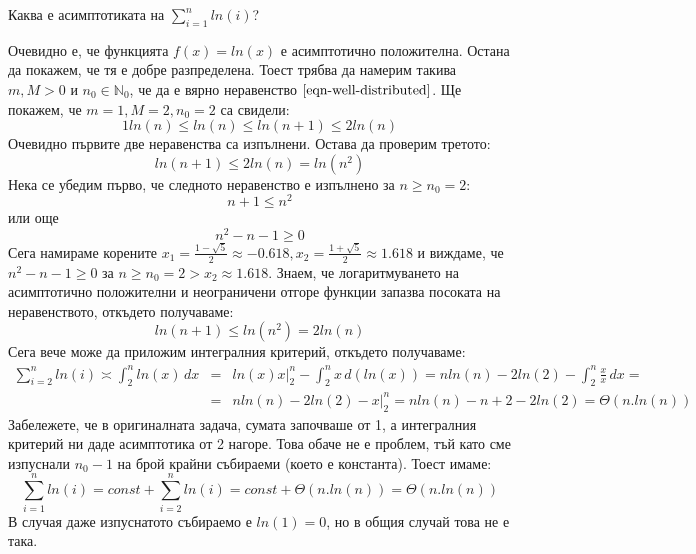 \begin{application}
	Каква е асимптотиката на $\sum\limits_{i=1}^nln(i)$?
\end{application}
\begin{solution}
	Очевидно е, че функцията $f(x)=ln(x)$ е асимптотично положителна. Остана да покажем, че тя е добре разпределена. Тоест трябва да намерим такива $m,M>0$ и $n_0\in\mathbb{N}_0$, че да е вярно неравенство $\ref{eqn-well-distributed}$. Ще покажем, че $m=1,M=2,n_0=2$ са свидели:
	\begin{equation*}
		1ln(n)\le ln(n)\le ln(n+1)\le 2ln(n)
	\end{equation*}
	Очевидно първите две неравенства са изпълнени. Остава да проверим третото:
	\begin{equation*}
		ln(n+1)\le 2ln(n)=ln(n^2)
	\end{equation*}
	Нека се убедим първо, че следното неравенство е изпълнено за $n\ge n_0=2$:
	\begin{equation*}
		n+1\le n^2
	\end{equation*}
	или още
	\begin{equation*}
		n^2-n-1\ge0
	\end{equation*}
	Сега намираме корените $x_1=\frac{1-\sqrt5}{2}\approx-0.618,x_2=\frac{1+\sqrt5}{2}\approx1.618$ и виждаме, че $n^2-n-1\ge0$ за $n\ge n_0=2>x_2\approx1.618$.
	Знаем, че логаритмуването на асимптотично положителни и неограничени отгоре функции запазва посоката на неравенството, откъдето получаваме:
	\begin{equation*}
		ln(n+1)\le ln(n^2)=2ln(n)
	\end{equation*}
	Сега вече може да приложим интегралния критерий, откъдето получаваме:
	\begin{eqnarray*}
		\displaystyle\sum_{i=2}^nln(i)\asymp\displaystyle\int_2^nln(x)\,dx & = & ln(x)x\Big|^n_2-\displaystyle\int_2^nx\,d(ln(x))=nln(n)-2ln(2)-\displaystyle\int_2^n\frac xx\,dx= \\
		& = & nln(n)-2ln(2)-x\Big|^n_2=nln(n)-n+2-2ln(2)=\Theta(n.ln(n))
	\end{eqnarray*}
	Забележете, че в оригиналната задача, сумата започваше от 1, а интегралния критерий ни даде асимптотика от 2 нагоре. Това обаче не е проблем, тъй като сме изпуснали $n_0-1$ на брой крайни събираеми (което е константа). Тоест имаме:
	\begin{equation*}
		\displaystyle\sum_{i=1}^nln(i)=const+\displaystyle\sum_{i=2}^nln(i)=const+\Theta(n.ln(n))=\Theta(n.ln(n))
	\end{equation*}
	В случая даже изпуснатото събираемо е $ln(1)=0$, но в общия случай това не е така.
\end{solution}\leavevmode\newline

